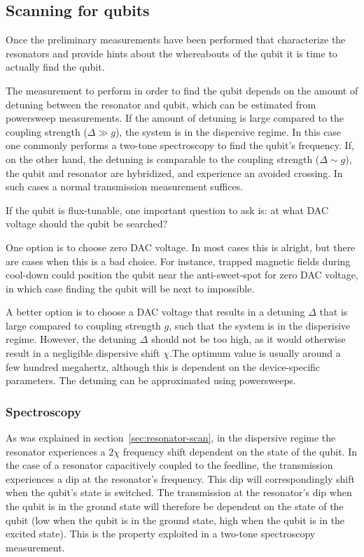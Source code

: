       \subsection{Scanning for qubits}
        \label{sec:spectroscopy}
        Once the preliminary measurements have been performed that characterize the resonators and provide hints about the whereabouts of the qubit it is time to actually find the qubit.

        The measurement to perform in order to find the qubit depends on the amount of detuning between the resonator and qubit, which can be estimated from powersweep measurements. If the amount of detuning is large compared to the coupling strength ($\Delta \gg  g$), the system is in the dispersive regime. In this case one commonly performs a two-tone spectroscopy to find the qubit's frequency. If, on the other hand, the detuning is comparable to the coupling strength ($\Delta \sim g$), the qubit and resonator are hybridized, and experience an avoided crossing. In such cases a normal transmission measurement suffices.

        If the qubit is flux-tunable, one important question to ask is: at what DAC voltage should the qubit be searched?

        One option is to choose zero DAC voltage. In most cases this is alright, but there are cases when this is a bad choice. For instance, trapped magnetic fields during cool-down could position the qubit near the anti-sweet-spot for zero DAC voltage, in which case finding the qubit will be next to impossible.

        A better option is to choose a DAC voltage that results in a detuning $\Delta$ that is large compared to coupling strength $g$, such that the system is in the disperisive regime. However, the detuning $\Delta$ should not be too high, as it would otherwise result in a negligible dispersive shift $\chi$.The optimum value is usually around a few hundred megahertz, although this is dependent on the device-specific parameters. The detuning can be approximated using powersweeps.

        \subsubsection{Spectroscopy}
          As was explained in section~\ref{sec:resonator-scan}, in the dispersive regime the resonator experiences a $2 \chi$ frequency shift dependent on the state of the qubit. In the case of a resonator capacitively coupled to the feedline, the transmission experiences a dip at the resonator's frequency. This dip will correspondingly shift when the qubit's state is switched. The transmission at the resonator's dip when the qubit is in the ground state will therefore be dependent on the state of the qubit (low when the qubit is in the ground state, high when the qubit is in the excited state). This is the property exploited in a two-tone spectroscopy measurement.

